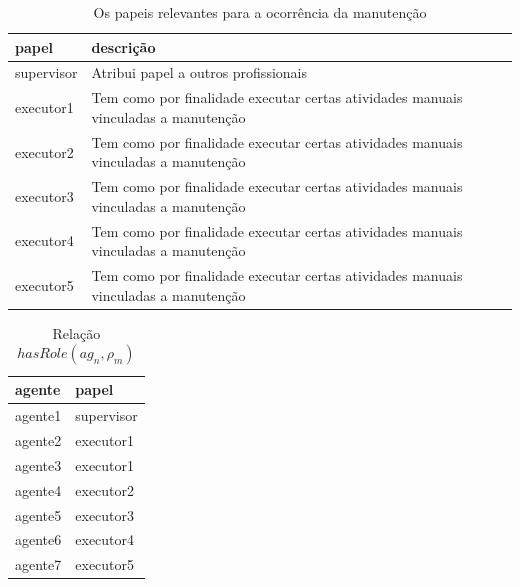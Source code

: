 \documentclass[12pt]{article}
\begin{document}
\begin{table}[H]
\centering
\begin{tabular}{|l|l|}
\hline
\textbf{papel} & \textbf{descrição} \\ \hline
supervisor & Atribui papel a outros profissionais \\ \hline
executor1 & Tem como por finalidade executar certas atividades manuais vinculadas a manutenção \\ \hline
executor2 & Tem como por finalidade executar certas atividades manuais vinculadas a manutenção \\ \hline
executor3 & Tem como por finalidade executar certas atividades manuais vinculadas a manutenção \\ \hline
executor4 & Tem como por finalidade executar certas atividades manuais vinculadas a manutenção \\ \hline
executor5 & Tem como por finalidade executar certas atividades manuais vinculadas a manutenção \\ \hline
\end{tabular}
\caption{Os papeis relevantes para a ocorrência da manutenção}
\label{roles}
\end{table}


\begin{table}[H]
\centering
\begin{tabular}{|l|l|}
\hline
\textbf{agente} & \textbf{papel} \\ \hline
agente1 & supervisor \\ \hline
agente2 & executor1 \\ \hline
agente3 & executor1 \\ \hline
agente4 & executor2 \\ \hline
agente5 & executor3 \\ \hline
agente6 & executor4 \\ \hline
agente7 & executor5 \\ \hline
\end{tabular}
\caption{Relação $hasRole(ag_n,\rho_m)$}
\label{agentsroles}
\end{table}
\end{document}
